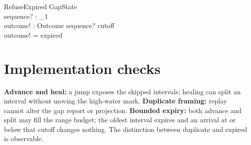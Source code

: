 \documentclass[a4paper,10pt,fleqn]{article}
\begin{document}
\begin{schema}{RefuseExpired}
  \Xi GapState \\
  sequence? : \nat_1 \\
  outcome! : Outcome
\where
  sequence? \leq cutoff \\
  outcome! = expired
\end{schema}

\section{Implementation checks}

\textbf{Advance and heal:} a jump exposes the skipped intervals; healing
can split an interval without moving the high-water mark.
\textbf{Duplicate framing:} replay cannot alter the gap report or projection.
\textbf{Bounded expiry:} both advance and split may fill the range budget; the
oldest interval expires and an arrival at or below that cutoff changes
nothing. The distinction between duplicate and expired is observable.
\end{document}
